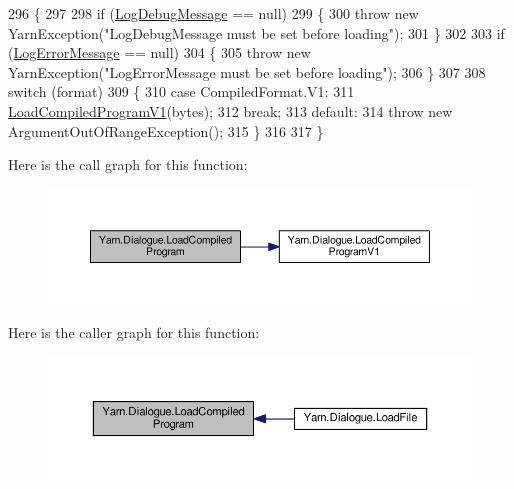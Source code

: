 \begin{DoxyCode}
296         \{
297 
298             \textcolor{keywordflow}{if} (\hyperlink{a00094_a381f48bb0fbb294f8cf44ca57f11be31}{LogDebugMessage} == null)
299             \{
300                 \textcolor{keywordflow}{throw} \textcolor{keyword}{new} YarnException(\textcolor{stringliteral}{"LogDebugMessage must be set before loading"});
301             \}
302 
303             \textcolor{keywordflow}{if} (\hyperlink{a00094_a9801e83dd044d6498fdf6ebcc6bec5ac}{LogErrorMessage} == null)
304             \{
305                 \textcolor{keywordflow}{throw} \textcolor{keyword}{new} YarnException(\textcolor{stringliteral}{"LogErrorMessage must be set before loading"});
306             \}
307 
308             \textcolor{keywordflow}{switch} (format)
309             \{
310                 \textcolor{keywordflow}{case} CompiledFormat.V1:
311                     \hyperlink{a00094_a706df08e842c2419f7a66fd40c0a544f}{LoadCompiledProgramV1}(bytes);
312                     \textcolor{keywordflow}{break};
313                 \textcolor{keywordflow}{default}:
314                     \textcolor{keywordflow}{throw} \textcolor{keyword}{new} ArgumentOutOfRangeException();
315             \}
316 
317         \}
\end{DoxyCode}


Here is the call graph for this function\-:
\nopagebreak
\begin{figure}[H]
\begin{center}
\leavevmode
\includegraphics[width=350pt]{a00094_a4bc1ceca26754dc3ec0a2281dfee26ce_cgraph}
\end{center}
\end{figure}




Here is the caller graph for this function\-:
\nopagebreak
\begin{figure}[H]
\begin{center}
\leavevmode
\includegraphics[width=350pt]{a00094_a4bc1ceca26754dc3ec0a2281dfee26ce_icgraph}
\end{center}
\end{figure}


